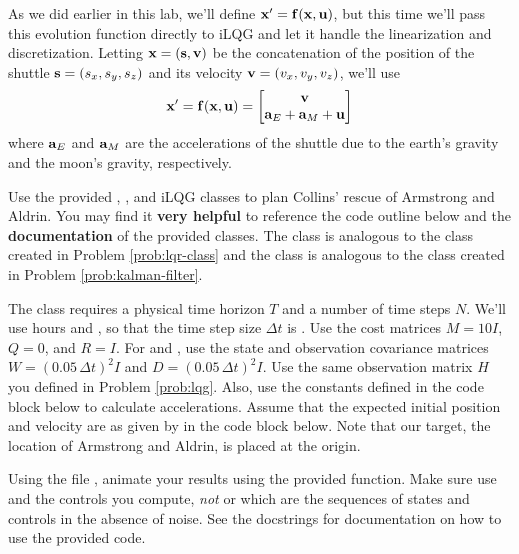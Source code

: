 As we did earlier in this lab, we'll define $\mathbf{x}' = \mathbf{f}(\mathbf{x}, \mathbf{u})$, but this time we'll pass this evolution function directly to iLQG and let it handle the linearization and discretization.
Letting $\mathbf{x} = (\mathbf s, \mathbf{v})$ be the concatenation of the position of the shuttle $\mathbf s = (s_x, s_y, s_z)$ and its velocity $\mathbf{v} = (v_x, v_y, v_z)$, we'll use
\begin{equation}
\mathbf{x}' = \mathbf{f}(\mathbf{x}, \mathbf{u}) =
\begin{bmatrix}
\mathbf{v} \\ \mathbf{a}_E + \mathbf{a}_M + \mathbf{u}
\end{bmatrix}
\label{eq:evolution-gravity}
\end{equation}
where $\mathbf{a}_E$ and $\mathbf{a}_M$ are the accelerations of the shuttle due to the earth's gravity and the moon's gravity, respectively.

\begin{problem}
Use the provided , , and iLQG  classes to plan Collins' rescue of Armstrong and Aldrin.
You may find it \textbf{very helpful} to reference the code outline below and the \textbf{documentation} of the provided classes.
The  class is analogous to the  class created in Problem \ref{prob:lqr-class} and the  class is analogous to the  class created in Problem \ref{prob:kalman-filter}.

The  class requires a physical time horizon $T$ and a number of time steps $N$.
We'll use  hours and , so that the time step size $\Delta t$ is .
Use the cost matrices $M = 10 I$, $Q = 0$, and $R = I$.
For  and , use the state and observation covariance matrices $W = (0.05 \, \Delta t)^2 I$ and $D = (0.05 \, \Delta t)^2 I$.
Use the same observation matrix $H$ you defined in Problem \ref{prob:lqg}.
Also, use the constants defined in the code block below to calculate accelerations.
Assume that the expected initial position and velocity are as given by  in the code block below.
Note that our target, the location of Armstrong and Aldrin, is placed at the origin.

Using the file , animate your results using the provided  function.
Make sure use  and the controls you compute, \emph{not}  or  which are the sequences of states and controls in the absence of noise.
See the docstrings for documentation on how to use the provided code.


\end{problem}
